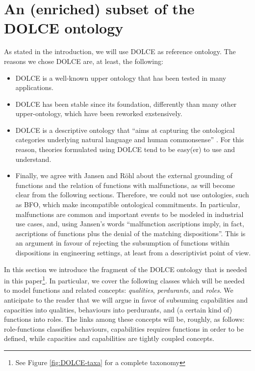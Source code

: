 \documentclass[sw]{iosart2x}
\newcommand{\DOLCE}{\textsc{DOLCE}\xspace} %
\newcommand{\BFO}{\textsc{BFO}\xspace}
\newcommand{\firstTimeKeyWord}[1]{\textit{#1}}
\newcommand{\qquotes}[1]{``#1''}
\begin{document}
\section{An (enriched) subset of the \DOLCE ontology\label{sec:DOLCE}} 
As stated in the introduction, we will use \DOLCE as reference ontology. 
The reasons we chose \DOLCE are, at least, the following:
\begin{itemize}
  \item \DOLCE is a well-known upper ontology that has been tested in many applications.
  \item \DOLCE has been stable since its foundation, differently than many other upper-ontology, which have been reworked exstensively.
  \item \DOLCE is a descriptive ontology that \qquotes{aims at capturing the ontological categories underlying natural language and human commonsense} \cite{masoloWonderWebDeliverableD182003}. 
  For this reason, theories formulated using \DOLCE tend to be easy(er) to use and understand.
  \item Finally, we agree with Jansen and Röhl \cite{rohlWhyFunctionsAre2014,jansenFunctionsMalfunctioningNegative2018} about the external grounding of functions and the relation of functions with malfunctions, as will become clear from the following sections. 
  Therefore, we could not use ontologies, such as \BFO, which make incompatible ontological commitments. 
  In particular, malfunctions are common and important events to be modeled in industrial use cases, and, using Jansen's words \cite{jansenFunctionsMalfunctioningNegative2018} \qquotes{malfunction ascriptions imply, in fact, ascriptions of functions plus the denial of the matching dispositions}. This is an argument in favour of rejecting the subsumption of functions within dispositions in engineering settings, at least from a descriptivist point of view.  
\end{itemize}

In this section we introduce the fragment of the \DOLCE ontology \cite{masoloWonderWebDeliverableD182003,borgoDOLCEDescriptiveOntology2022} that is needed in this paper\footnote{See Figure \ref{fig:DOLCE-taxa} for a complete taxonomy}. In particular, we cover the following classes which will be needed to model functions and related concepts: \firstTimeKeyWord{qualities}, \firstTimeKeyWord{perdurants}, and \firstTimeKeyWord{roles}. 
We anticipate to the reader that we will argue in favor of subsuming capabilities and capacities into qualities, behaviours into perdurants, and (a certain kind of) functions into roles. The links among these concepts will be, roughly, as follows: role-functions classifies behaviours, capabilities requires functions in order to be defined, while capacities and capabilities are tightly coupled concepts.  
\end{document}
